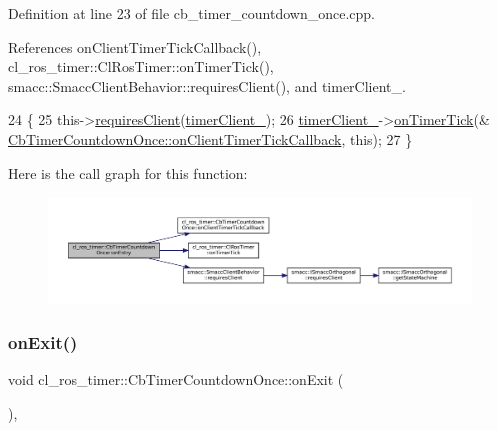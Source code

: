 Definition at line 23 of file cb\+\_\+timer\+\_\+countdown\+\_\+once.\+cpp.



References on\+Client\+Timer\+Tick\+Callback(), cl\+\_\+ros\+\_\+timer\+::\+Cl\+Ros\+Timer\+::on\+Timer\+Tick(), smacc\+::\+Smacc\+Client\+Behavior\+::requires\+Client(), and timer\+Client\+\_\+.


\begin{DoxyCode}
24 \{
25     this->\hyperlink{classsmacc_1_1SmaccClientBehavior_a917f001e763a1059af337bf4e164f542}{requiresClient}(\hyperlink{classcl__ros__timer_1_1CbTimerCountdownOnce_a2a969a829fcb39abcc0380ee420e3300}{timerClient\_});
26     \hyperlink{classcl__ros__timer_1_1CbTimerCountdownOnce_a2a969a829fcb39abcc0380ee420e3300}{timerClient\_}->\hyperlink{classcl__ros__timer_1_1ClRosTimer_a7edcc057bfb5a25fe0892755137dd8da}{onTimerTick}(&
      \hyperlink{classcl__ros__timer_1_1CbTimerCountdownOnce_a2b02bbde9c9321781b70b9371b22673a}{CbTimerCountdownOnce::onClientTimerTickCallback}, \textcolor{keyword}{this});
27 \}
\end{DoxyCode}
Here is the call graph for this function\+:
\nopagebreak
\begin{figure}[H]
\begin{center}
\leavevmode
\includegraphics[width=350pt]{classcl__ros__timer_1_1CbTimerCountdownOnce_a613662c4a4106ece0ce1dee198d1aba2_cgraph}
\end{center}
\end{figure}
\mbox{\label{classcl__ros__timer_1_1CbTimerCountdownOnce_ab602b778a299b42e8cc9f4bf3da0a234}} 
\subsubsection{\texorpdfstring{on\+Exit()}{onExit()}}
{\footnotesize\ttfamily void cl\+\_\+ros\+\_\+timer\+::\+Cb\+Timer\+Countdown\+Once\+::on\+Exit (\begin{DoxyParamCaption}{ }\end{DoxyParamCaption})\hspace{0.3cm}{\ttfamily [override]}, {\ttfamily [virtual]}}



